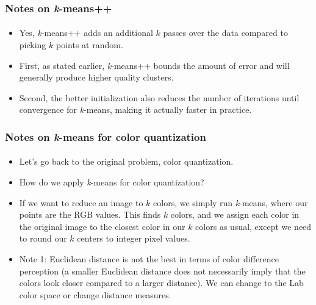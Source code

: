 \documentclass{beamer}                             %
\begin{document}
\begin{frame}
\frametitle{Notes on \textit{k}-means++}
\framesubtitle{}
\begin{itemize}[<+->]
  \item Yes, \textit{k}-means++ adds an additional \( k \) passes
    over the data compared to picking \( k \) points at random.
  \item First, as stated earlier, \textit{k}-means++ bounds the amount
    of error and will generally produce higher quality clusters.
  \item Second, the better initialization also reduces
    the number of iterations until convergence for
    \textit{k}-means, making it actually faster in practice.
\end{itemize} 
\end{frame}

\begin{frame}
\frametitle{Notes on \textit{k}-means for color quantization}
\framesubtitle{}
\begin{itemize}[<+->]
  \item Let's go back to the original problem, color quantization.
  \item How do we apply \textit{k}-means for color quantization?
  \item If we want to reduce an image to \( k \) colors, we simply run
    \textit{k}-means, where our points are the RGB values. This finds
    \( k \) colors, and we assign each color in the original image to
    the closest color in our \( k \) colors as usual, except we need
    to round our \( k \) centers to integer pixel values.
  \item Note 1: Euclidean distance is not the best in terms of color
    difference perception (a smaller Euclidean distance does not necessarily
    imply that the colors look closer compared to a larger distance). We
    can change to the Lab color space or change distance measures.
\end{itemize}
\end{frame}
\end{document}
